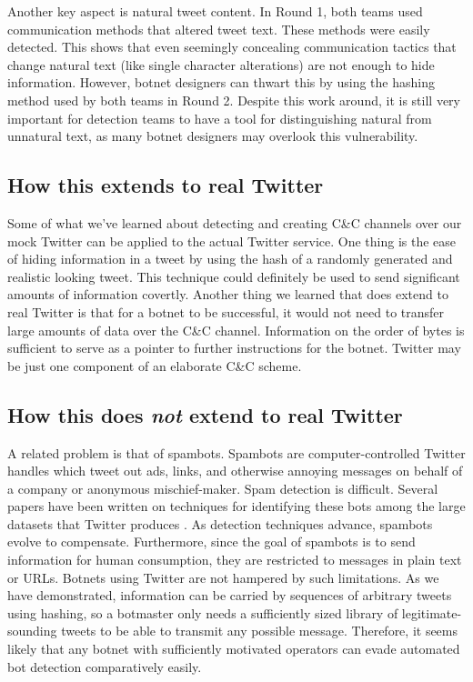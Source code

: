 \documentclass[11pt, oneside]{article} %
\numberwithin{equation}{section} %
\numberwithin{figure}{section} %
\numberwithin{table}{section} %
\begin{document}
		Another key aspect is natural tweet content. In Round 1, both teams used communication methods that altered tweet text. These methods were easily detected. This shows that even seemingly concealing communication tactics that change natural text (like single character alterations) are not enough to hide information. However, botnet designers can thwart this by using the hashing method used by both teams in Round 2. Despite this work around, it is still very important for detection teams to have a tool for distinguishing natural from unnatural text, as many botnet designers may overlook this vulnerability.

	\subsection{How this extends to real Twitter}
	Some of what we've learned about detecting and creating C\&C channels over our mock Twitter can be applied to the actual Twitter service. One thing is the ease of hiding information in a tweet by using the hash of a randomly generated and realistic looking tweet. This technique could definitely be used to send significant amounts of information covertly. Another thing we learned that does extend to real Twitter is that for a botnet to be successful, it would not need to transfer large amounts of data over the C\&C channel. Information on the order of bytes is sufficient to serve as a pointer to further instructions for the botnet. Twitter may be just one component of an elaborate C\&C scheme.

	\subsection{How this does \textit{not} extend to real Twitter}
    A related problem is that of spambots. Spambots are computer-controlled Twitter handles which tweet out ads, links, and otherwise annoying messages on behalf of a company or anonymous mischief-maker. Spam detection is difficult. Several papers have been written on techniques for identifying these bots among the large datasets that Twitter produces \cite{botdetect, spambotML, socialnet_spam}. As detection techniques advance, spambots evolve to compensate. Furthermore, since the goal of spambots is to send information for human consumption, they are restricted to messages in plain text or URLs. Botnets using Twitter are not hampered by such limitations. As  we have demonstrated, information can be carried by sequences of arbitrary  tweets using hashing, so a botmaster only needs a sufficiently sized  library of legitimate-sounding tweets to be able to transmit any possible message. Therefore, it seems likely that any botnet with sufficiently motivated operators can evade automated bot detection comparatively easily.
 
\end{document}
